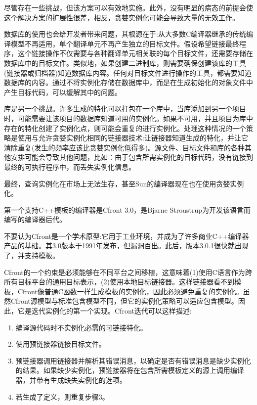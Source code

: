 尽管存在一些挑战，但该方案可以有效地实施。此外，没有明显的病态的前提会使这个解决方案的扩展性很差，相反，贪婪实例化可能会导致大量的无效工作。

数据库的使用也会给开发者带来问题，其根源在于:从大多数C编译器继承的传统编译模型不再适用，单个翻译单元不再产生独立的目标文件。假设希望链接最终程序，这个链接操作不仅需要与各种翻译单元相关联的每个目标文件，还需要存储在数据库中的目标文件。类似地，如果创建二进制库，则需要确保创建该库的工具(链接器或归档器)知道数据库内容。任何对目标文件进行操作的工具，都需要知道数据库的内容。通过不将实例化存储在数据库中，而是在生成初始化的对象文件中产生目标代码，可以缓解其中的问题。

库是另一个挑战。许多生成的特化可以打包在一个库中，当库添加到另一个项目时，可能需要让该项目的数据库知道可用的实例化。如果不可用，并且项目为库中存在的特化创建了实例化点，则可能会重复的进行实例化。处理这种情况的一个策略是使用与允许贪婪实例化相同的链接器技术:让链接器知道生成的特化，并让它清除重复(发生的频率应该比贪婪实例化低得多)。源文件、目标文件和库的各种其他安排可能会导致其他问题，比如：由于包含所需实例化的目标代码，没有链接到最终的可执行程序中，而丢失实例化信息。

最终，查询实例化在市场上无法生存，甚至Sun的编译器现在也在使用贪婪实例化。


第一个支持C++模板的编译器是Cfront 3.0，是Bjarne Stroustrup为开发该语言而编写的编译器后代。

\begin{tcolorbox}[colback=webgreen!5!white,colframe=webgreen!75!black]
\hspace*{0.75cm}不要认为Cfront是一个学术原型:它用于工业环境，并成为了许多商业C++编译器产品的基础。其3.0版本于1991年发布，但漏洞百出。此后，版本3.0.1很快就出现了，并支持模板。
\end{tcolorbox}

Cfront的一个约束是必须能够在不同平台之间移植，这意味着(1)使用C语言作为跨所有目标平台的通用目标表示，(2)使用本地目标链接器。这样链接器看不到模板，Cfront像普通C函数一样生成模板的实例化，因此必须避免重复的实例化。虽然Cfront源模型与标准包含模型不同，但它的实例化策略可以适应包含模型。因此，它是迭代实例化的第一个实现。Cfront迭代可以这样描述:

\begin{enumerate}
\item 
编译源代码时不实例化必需的可链接特化。

\item 
使用预链接器链接目标文件。

\item 
预链接器调用链接器并解析其错误消息，以确定是否有错误消息是缺少实例化的结果。如果缺少实例化，预链接器将在包含所需模板定义的源上调用编译器，并带有生成缺失实例化的选项。

\item 
若生成了定义，则重复步骤3。
\end{enumerate}

